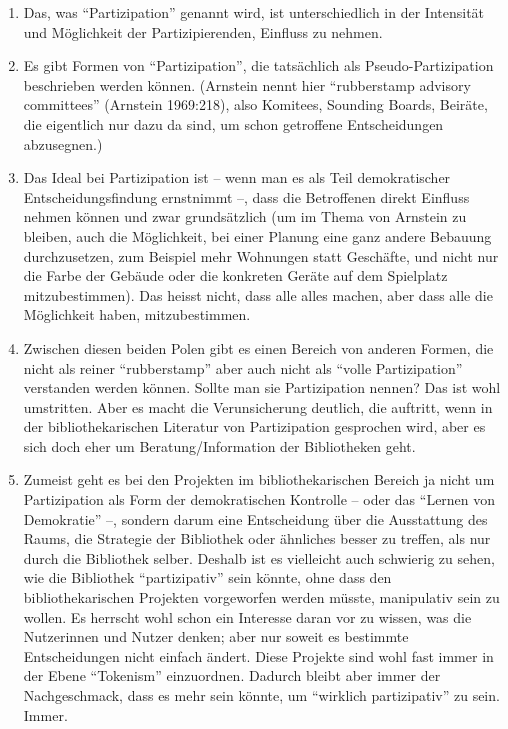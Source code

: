 \documentclass[a4paper,
fontsize=11pt,
oneside,
numbers=noperiodatend,
parskip=half-,
bibliography=totoc,
final
]{scrartcl}
\begin{document}
\begin{enumerate}
\def\labelenumi{\arabic{enumi}.}
\item
  Das, was \enquote{Partizipation} genannt wird, ist unterschiedlich in
  der Intensität und Möglichkeit der Partizipierenden, Einfluss zu
  nehmen.
\item
  Es gibt Formen von \enquote{Partizipation}, die tatsächlich als
  Pseudo-Partizipation beschrieben werden können. (Arnstein nennt hier
  \enquote{rubberstamp advisory committees} (Arnstein 1969:218), also
  Komitees, Sounding Boards, Beiräte, die eigentlich nur dazu da sind,
  um schon getroffene Entscheidungen abzusegnen.)
\item
  Das Ideal bei Partizipation ist -- wenn man es als Teil demokratischer
  Entscheidungsfindung ernstnimmt --, dass die Betroffenen direkt
  Einfluss nehmen können und zwar grundsätzlich (um im Thema von
  Arnstein zu bleiben, auch die Möglichkeit, bei einer Planung eine ganz
  andere Bebauung durchzusetzen, zum Beispiel mehr Wohnungen statt
  Geschäfte, und nicht nur die Farbe der Gebäude oder die konkreten
  Geräte auf dem Spielplatz mitzubestimmen). Das heisst nicht, dass alle
  alles machen, aber dass alle die Möglichkeit haben, mitzubestimmen.
\item
  Zwischen diesen beiden Polen gibt es einen Bereich von anderen Formen,
  die nicht als reiner \enquote{rubberstamp} aber auch nicht als
  \enquote{volle Partizipation} verstanden werden können. Sollte man sie
  Partizipation nennen? Das ist wohl umstritten. Aber es macht die
  Verunsicherung deutlich, die auftritt, wenn in der bibliothekarischen
  Literatur von Partizipation gesprochen wird, aber es sich doch eher um
  Beratung/Information der Bibliotheken geht.
\item
  Zumeist geht es bei den Projekten im bibliothekarischen Bereich ja
  nicht um Partizipation als Form der demokratischen Kontrolle -- oder
  das \enquote{Lernen von Demokratie} --, sondern darum eine
  Entscheidung über die Ausstattung des Raums, die Strategie der
  Bibliothek oder ähnliches besser zu treffen, als nur durch die
  Bibliothek selber. Deshalb ist es vielleicht auch schwierig zu sehen,
  wie die Bibliothek \enquote{partizipativ} sein könnte, ohne dass den
  bibliothekarischen Projekten vorgeworfen werden müsste, manipulativ
  sein zu wollen. Es herrscht wohl schon ein Interesse daran vor zu
  wissen, was die Nutzerinnen und Nutzer denken; aber nur soweit es
  bestimmte Entscheidungen nicht einfach ändert. Diese Projekte sind
  wohl fast immer in der Ebene \enquote{Tokenism} einzuordnen. Dadurch
  bleibt aber immer der Nachgeschmack, dass es mehr sein könnte, um
  \enquote{wirklich partizipativ} zu sein. Immer.
\end{enumerate}
\end{document}
